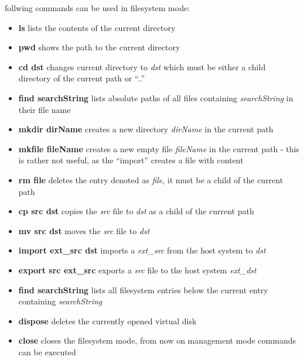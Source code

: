 follwing commands can be used in filesystem mode:

\begin{itemize}
  \item {\textbf{ls}} lists the contents of the current directory
  \item {\textbf{pwd}} shows the path to the current directory
  \item {\textbf{cd dst}} changes current directory to \textit{dst} which must
  be either a child directory of the current path or ``..''
  \item {\textbf{find searchString}} lists absolute paths of all files
  containing \textit{searchString} in their file name
  \item {\textbf{mkdir dirName}} creates a new directory \textit{dirName} in the
  current path
  \item {\textbf{mkfile fileName}} creates a new empty file \textit{fileName} in
  the current path - this is rather not useful, as the ``import'' creates a
  file with content
  \item {\textbf{rm file}} deletes the entry denoted as \textit{file}, it must
  be a child of the current path
  \item {\textbf{cp src dst}} copies the \textit{src} file to \textit{dst} as a
  child of the current path
  \item {\textbf{mv src dst}} moves the \textit{src} file to \textit{dst}
  \item {\textbf{import ext\_src dst}} imports a \textit{ext\_src} from the
  host system to \textit{dst}
  \item {\textbf{export src ext\_src}} exports a \textit{src} file to the host
  system \textit{ext\_dst}
  \item {\textbf{find searchString}} lists all filesystem entries below the
  current entry containing \textit{searchString}
  \item {\textbf{dispose}} deletes the currently opened virtual disk
  \item {\textbf{close}} closes the filesystem mode, from now on management mode
  commands can be executed
\end{itemize}